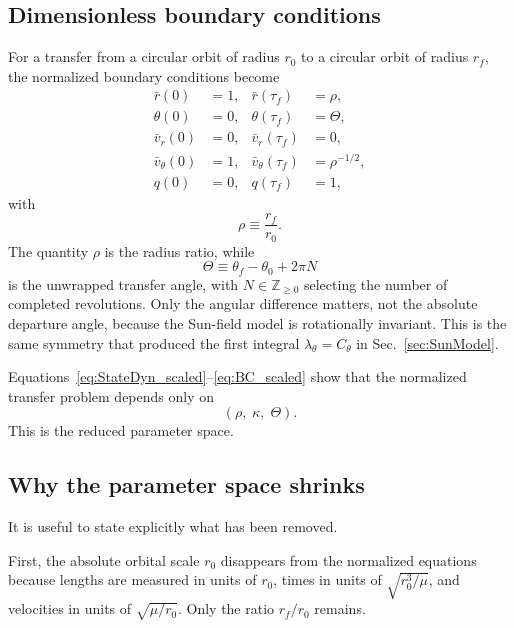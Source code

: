 \documentclass[journal, a4paper]{IEEEtran}
\begin{document}
\subsection{Dimensionless boundary conditions}
For a transfer from a circular orbit of radius \(r_0\) to a circular orbit of radius \(r_f\), the normalized boundary conditions become
\begin{subequations}\label{eq:BC_scaled}
\begin{align}
  \bar r(0) &= 1, &
  \bar r(\tau_f) &= \rho, \\
  \theta(0) &= 0, &
  \theta(\tau_f) &= \Theta,\\
  \bar v_r(0) &= 0, &  \bar v_r(\tau_f) &= 0, \\
  \bar v_\theta(0) &= 1, &\bar v_\theta(\tau_f) &= \rho^{-1/2}, \\
  q(0) &= 0, &q(\tau_f) &= 1,  
\end{align}
\end{subequations}
with
\begin{equation}
  \rho \equiv \frac{r_f}{r_0}.
  \label{eq:rho_def_similarity}
\end{equation}
The quantity \(\rho\) is the radius ratio, while
\begin{equation}
  \Theta \equiv \theta_f-\theta_0+2\pi N
  \label{eq:Theta_def_similarity}
\end{equation}
is the unwrapped transfer angle, with \(N\in\mathbb Z_{\ge 0}\) selecting the number of completed revolutions. 
Only the angular difference matters, not the absolute departure angle, because the Sun-field model is rotationally invariant. 
This is the same symmetry that produced the first integral \(\lambda_\theta=C_\theta\) in Sec.~\ref{sec:SunModel}.

Equations~\eqref{eq:StateDyn_scaled}--\eqref{eq:BC_scaled} show that the normalized transfer problem depends only on
\[
(\rho,\;\kappa,\;\Theta).
\]
This is the reduced parameter space.

\subsection{Why the parameter space shrinks}
It is useful to state explicitly what has been removed.

First, the absolute orbital scale \(r_0\) disappears from the normalized equations because lengths are measured in units of \(r_0\), times in units of \(\sqrt{r_0^3/\mu}\), and velocities in units of \(\sqrt{\mu/r_0}\). 
Only the ratio \(r_f/r_0\) remains.
\end{document}
